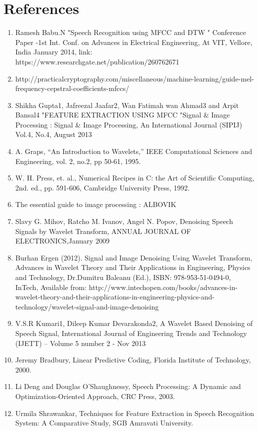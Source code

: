\documentclass[12pt, a4paper, twoside]{report}
\begin{document}
\section*{References}
\begin{enumerate}[label=(\arabic*), noitemsep]
\item Ramesh    Babu.N "Speech Recognition using MFCC and DTW " Conference    Paper -1st Int. Conf. on Advances in Electrical Engineering, At VIT, Vellore, India January 2014, link: https://www.researchgate.net/publication/260762671
\item http://practicalcryptography.com/miscellaneous/machine-learning/guide-mel-frequency-cepstral-coefficients-mfccs/
\item Shikha Gupta1, Jafreezal Jaafar2, Wan Fatimah wan Ahmad3  and Arpit Bansal4 "FEATURE EXTRACTION USING MFCC "Signal \& Image Processing : Signal \& Image Processing, An International Journal (SIPIJ) Vol.4, No.4, August 2013
\item A. Graps, “An Introduction to Wavelets,” IEEE Computational Sciences and Engineering, vol. 2, no.2, pp 50-61, 1995.
\item W. H. Press, et. al., Numerical Recipes in C: the Art of Scientific Computing, 2nd. ed., pp. 591-606, Cambridge University Press, 1992.
\item The essential guide to image processing : ALBOVIK
\item Slavy G. Mihov, Ratcho M. Ivanov, Angel N. Popov, Denoising Speech Signals by Wavelet Transform, ANNUAL JOURNAL OF ELECTRONICS,January 2009
\item Burhan Ergen (2012). Signal and Image Denoising Using Wavelet Transform, Advances in Wavelet Theory and Their Applications in Engineering, Physics and Technology, Dr.Dumitru Baleanu (Ed.), ISBN: 978-953-51-0494-0, InTech, Available from: http://www.intechopen.com/books/advances-in-wavelet-theory-and-their-applications-in-engineering-physics-and-technology/wavelet-signal-and-image-denoising
\item V.S.R Kumari1, Dileep Kumar Devarakonda2, A Wavelet Based Denoising of Speech Signal, International Journal of Engineering Trends and Technology (IJETT) – Volume 5 number 2 - Nov 2013
\item Jeremy Bradbury, Linear Predictive Coding, Florida Institute of Technology, 2000.
\item Li Deng and Douglas O'Shaughnessy, Speech Processing: A Dynamic and Optimization-Oriented Approach, CRC Press, 2003.
\item Urmila Shrawankar, Techniques for Feature Extraction in Speech Recognition System: A Comparative Study, SGB Amravati University.
\end{enumerate}
\end{document}
